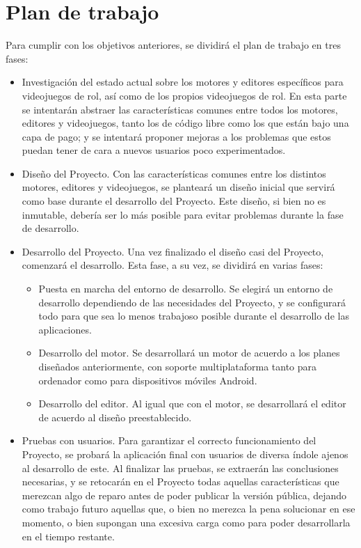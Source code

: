 \section{Plan de trabajo}
Para cumplir con los objetivos anteriores, se dividirá el plan de trabajo en tres fases:
\begin{itemize}
	\item Investigación del estado actual sobre los motores y editores específicos para videojuegos de rol, así como de los propios videojuegos de rol. En esta parte se intentarán abstraer las características comunes entre todos los motores, editores y videojuegos, tanto los de código libre como los que están bajo una capa de pago; y se intentará proponer mejoras a los problemas que estos puedan tener de cara a nuevos usuarios poco experimentados.
	\item Diseño del Proyecto. Con las características comunes entre los distintos motores, editores y videojuegos, se planteará un diseño inicial que servirá como base durante el desarrollo del Proyecto. Este diseño, si bien no es inmutable, debería ser lo más  posible para evitar problemas durante la fase de desarrollo.
	\item Desarrollo del Proyecto. Una vez finalizado el diseño casi  del Proyecto, comenzará el desarrollo. Esta fase, a su vez, se dividirá en varias fases:
		\begin{itemize}
			\item Puesta en marcha del entorno de desarrollo. Se elegirá un entorno de desarrollo dependiendo de las necesidades del Proyecto, y se configurará todo para que sea lo menos trabajoso posible durante el desarrollo de las aplicaciones. 
			\item Desarrollo del motor. Se desarrollará un motor de acuerdo a los planes diseñados anteriormente, con soporte multiplataforma tanto para ordenador como para dispositivos móviles Android.
			\item Desarrollo del editor. Al igual que con el motor, se desarrollará el editor de acuerdo al diseño preestablecido.
		\end{itemize}
	\item Pruebas con usuarios. Para garantizar el correcto funcionamiento del Proyecto, se probará la aplicación final con usuarios de diversa índole ajenos al desarrollo de este. Al finalizar las pruebas, se extraerán las conclusiones necesarias, y se retocarán en el Proyecto todas aquellas características que merezcan algo de reparo antes de poder publicar la versión pública, dejando como trabajo futuro aquellas que, o bien no merezca la pena solucionar en ese momento, o bien supongan una excesiva carga como para poder desarrollarla en el tiempo restante.
\end{itemize}


